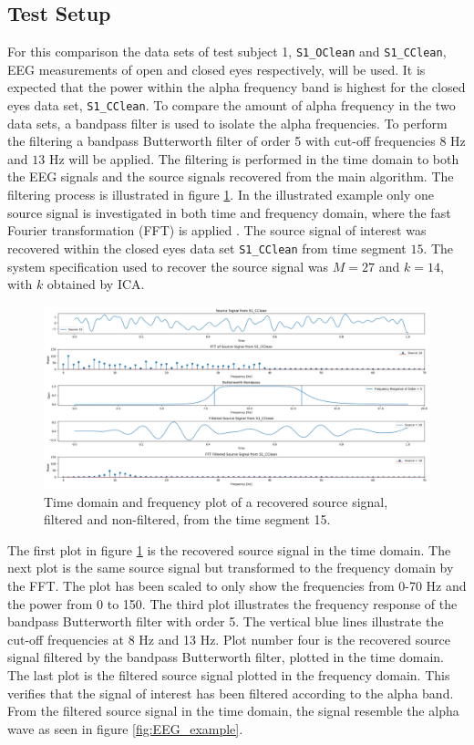 \subsection{Test Setup}
For this comparison the data sets of test subject 1, \texttt{S1\_OClean} and \texttt{S1\_CClean}, EEG measurements of open and closed eyes respectively, will be used. 
It is expected that the power within the alpha frequency band is highest for the closed eyes data set, \texttt{S1\_CClean}.
To compare the amount of alpha frequency in the two data sets, a bandpass filter is used to isolate the alpha frequencies. 
To perform the filtering a bandpass Butterworth filter of order 5 with cut-off frequencies $8$ Hz and $13$ Hz will be applied. 
The filtering is performed in the time domain to both the EEG signals and the source signals recovered from the main algorithm.
The filtering process is illustrated in figure \ref{fig:dft_1}.
In the illustrated example only one source signal is investigated in both time and frequency domain, where the fast Fourier transformation (FFT) is applied \cite[Chapter 9]{FFT}. 
The source signal of interest was recovered within the closed eyes data set \texttt{S1\_CClean} from time segment $15$. 
The system specification used to recover the source signal was $M = 27$ and $k = 14$, with $k$ obtained by ICA.
\begin{figure}[H]
\centering
\includegraphics[scale=0.28]{figures/ch_7/DFT_plot_X_timeseg15_source10.png}
\caption{Time domain and frequency plot of a recovered source signal, filtered and non-filtered, from the time segment 15.}
\label{fig:dft_1}
\end{figure}
\noindent
The first plot in figure \ref{fig:dft_1} is the recovered source signal in the time domain. 
The next plot is the same source signal but transformed to the frequency domain by the FFT. 
The plot has been scaled to only show the frequencies from 0-70 Hz and the power from 0 to 150. 
The third plot illustrates the frequency response of the bandpass Butterworth filter with order 5. 
The vertical blue lines illustrate the cut-off frequencies at 8 Hz and 13 Hz.
Plot number four is the recovered source signal filtered by the bandpass Butterworth filter, plotted in the time domain. 
The last plot is the filtered source signal plotted in the frequency domain. 
This verifies that the signal of interest has been filtered according to the alpha band. 
From the filtered source signal in the time domain, the signal resemble the alpha wave as seen in figure \ref{fig:EEG_example}.

